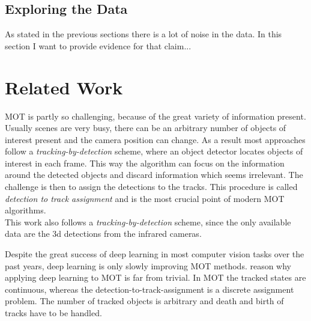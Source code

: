 \documentclass{article}
\begin{document}
\subsection{Exploring the Data}
\label{data_noise}

As stated in the previous sections there is a lot of noise in the data. In this section I want to provide evidence for that claim...



\section{Related Work}



MOT is partly so challenging, because of the great variety of information present. Usually scenes are very busy, there can be an arbitrary number of objects of interest present and the camera position can change. As a result most approaches follow a \emph{tracking-by-detection} scheme, where an object detector locates objects of interest in each frame. This way the algorithm can focus on the information around the detected objects and discard information which seems irrelevant. The challenge is then to assign the detections to the tracks. This procedure is called \emph{detection to track assignment} and is the most crucial point of modern MOT algorithms. \\
This work also follows a \emph{tracking-by-detection} scheme, since the only available data are the 3d detections from the infrared cameras.

Despite the great success of deep learning in most computer vision tasks over the past years, deep learning is only slowly improving MOT methods. \cite{milan_rnn_tracking} reason why applying deep learning to MOT is far from trivial. In MOT the tracked states are continuous, whereas the detection-to-track-assignment is a discrete assignment problem. The number of tracked objects is arbitrary and death and birth of tracks have to be handled. 
\end{document}
